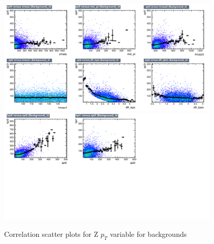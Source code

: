 \begin{figure}[!htb]%
\centering
\includegraphics[width=0.95\textwidth]{figures/CRTT/dataset/plots/correlationscatter_zpt0__Id_c3.pdf}
\includegraphics[width=0.95\textwidth]{figures/CRTT/dataset/plots/correlationscatter_zpt0__Id_c4.pdf}
\caption{ Correlation scatter plots for Z $p_{T}$ variable for backgrounds}%
\label{fig:correlations_CRTT_zpt_BG}                                                       
\end{figure}


